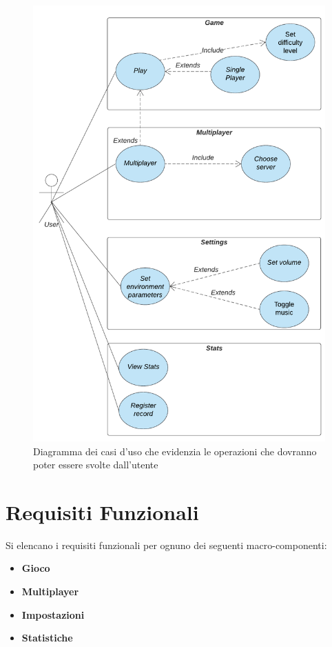 	\begin{figure}[H]
		\centering
		\includegraphics[width=0.80\columnwidth]{Diagrams/useCaseDiagram}
		\caption{Diagramma dei casi d'uso che evidenzia le operazioni che dovranno poter essere svolte dall'utente}
		\label{fig:figure1}
	\end{figure}

	
	\section{Requisiti Funzionali}
	Si elencano i requisiti funzionali per ognuno dei seguenti macro-componenti:
	\begin{itemize}
	    \item \textbf{Gioco}
	    \item \textbf{Multiplayer}
	    \item \textbf{Impostazioni}
	    \item \textbf{Statistiche}
	\end{itemize}

